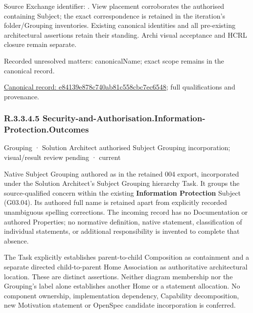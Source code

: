 Source Exchange identifier: \texttt{}. View placement corroborates
the authorised containing Subject; the exact correspondence is retained in the
iteration's folder/Grouping inventories. Existing canonical identities and all
pre-existing architectural assertions retain their standing. Archi visual
acceptance and HCRL closure remain separate.


{\small Recorded unresolved matters: canonicalName; exact scope remains in the canonical record.}\par
{\footnotesize \href{../../../../continuum/grouping/e84139e878c740ab81c558cbc7ec6548.md}{Canonical record: e84139e878c740ab81c558cbc7ec6548}; full qualifications and provenance.}\par
\subsubsection*{R.3.3.4.5 Security-and-Authorisation.Information-Protection.Outcomes}
\label{navigation:R.3.3.4.5}

\label{element:b6ff7b82c59e4125868902e34d89630d}
{\small Grouping · Solution Architect authorised Subject Grouping incorporation; visual/result review pending · current}\par

Native Subject Grouping authored as \texttt{} in the retained 004 export,
incorporated under the Solution Architect's Subject Grouping hierarchy Task.
It groups the source-qualified \texttt{} concern within
the existing \textbf{Information Protection} Subject (G03.04). Its authored full name
is retained apart from explicitly recorded unambiguous spelling corrections.
The incoming record has no Documentation or authored Properties; no normative
definition, native statement, classification of individual statements, or
additional responsibility is invented to complete that absence.



The Task explicitly establishes parent-to-child Composition as containment and
a separate directed child-to-parent Home Association as authoritative architectural
location. These are distinct assertions. Neither diagram membership nor the
Grouping's label alone establishes another Home or a statement allocation.
No component ownership, implementation dependency, Capability decomposition,
new Motivation statement or OpenSpec candidate incorporation is conferred.



